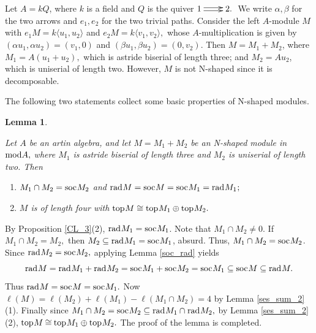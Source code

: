 \documentclass[10pt]{amsart}
\newtheorem{Lemma}[Theo]{Lemma}
\theoremstyle{definition}
\newcommand{\mmod}{{\rm mod}}
\newcommand{\rad}{{\rm rad}\hspace{.5pt}}
\newcommand{\soc}{{\rm soc}\hspace{.5pt}}
\newcommand{\ntop}{{\rm top}\hspace{.5pt}}
\begin{document}
 Let $A=kQ$, where $k$ is a field and $Q$ is the quiver $\hspace{-3pt}\xymatrixcolsep{22pt}\xymatrix{1 \ar@<0.4ex>[r] \ar@<-0.4ex>[r] & 2.}$ We write $\alpha, \beta$ for the two arrows and $e_1, e_2$ for the two trivial paths. Consider the left $A$-module $M$ with $e_1M=k\langle u_1, u_2\rangle$ and $e_2M=k\langle v_1, v_2\rangle,$ whose $A$-multiplication is given by $(\alpha u_1, \alpha u_2)=(v_1, 0)$ and $(\beta u_1, \beta u_2)=(0, v_2)$. Then $M=M_1+M_2$, where $M_1=A(u_1+u_2),$ which is astride biserial of length three;
and $M_2=Au_2$, which is uniserial of length two. However, $M$ is not N-shaped since it is decomposable.

\smallskip

The following two statements collect some basic properties of N-shaped modules.

\begin{Lemma}\label{N_mod_property_0}

Let $A$ be an artin algebra, and let $M=M_1+M_2$ be an N-shaped module in $\mmod A,$ where $M_1$ is astride biserial of length three and $M_2$ is uniserial of length two. Then 

\begin{enumerate}[$(1)$]

\vspace{-2.5pt}

\item $M_1\cap M_2=\soc M_2$ and $\rad M=\soc M=\soc M_1=\rad M_1\hspace{.5pt};$

\item $M$ is of length four with $\ntop M %
\cong \ntop M_1 \oplus \ntop M_2.$ 

\end{enumerate} \end{Lemma}

\vspace{-1.5pt}

 By Proposition \ref{CL_3}(2), $\rad M_1=\soc M_1$. Note that $M_1\cap M_2\ne 0.$  \vspace{-1pt} If $M_1\cap M_2=M_2,$ then $M_2\subseteq \rad M_1=\soc M_1$, absurd. Thus, $M_1\cap M_2=\soc M_2$. Since $\rad M_2=\soc M_2,$ applying Lemma \ref{soc_rad} yields
\vspace{-4.5pt} $$\rad M= \rad M_1+\rad M_2= \soc M_1+\soc M_2= \soc M_1   \subseteq \soc M\subseteq \rad M. \vspace{-4.5pt}$$ 
Thus $\rad M=\soc M=\soc M_1.$ Now $\ell(M)=\ell(M_2)+\ell(M_1)-\ell(M_1\cap M_2)=4$ by Lemma \ref{ses_sum_2}(1). Finally since $M_1\cap M_2=\soc M_2\subseteq \rad M_1 \cap \hspace{.5pt}  \rad M_2,$ by Lemma \ref{ses_sum_2}(2), $\ntop M \hspace{-.5pt} \cong \hspace{-.5pt}  \ntop M_1 \oplus \ntop M_2.$ The proof of the lemma is completed. 
\end{document}
